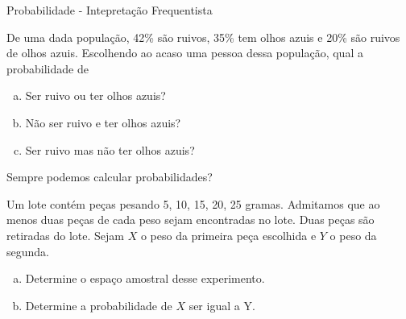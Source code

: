 \begin{frame}{Probabilidade - Intepretação Frequentista}
    \begin{exemplo}
        De uma dada população, 42\% são ruivos, 35\% tem olhos azuis e 20\% são ruivos de olhos azuis. Escolhendo ao acaso uma pessoa dessa população, qual a probabilidade de
        \begin{enumerate}[a)] %
            \item Ser ruivo ou ter olhos azuis?
            \item Não ser ruivo e ter olhos azuis?
            \item Ser ruivo mas não ter olhos azuis?
        \end{enumerate}
    \end{exemplo}

\end{frame}

\begin{frame}{Sempre podemos calcular probabilidades?}
    \begin{exemplo}
        Um lote contém peças pesando 5, 10, 15, 20, 25 gramas. Admitamos que ao menos duas peças de cada peso sejam encontradas no lote. Duas peças são retiradas do lote. Sejam $X$ o peso da primeira peça escolhida e $Y$ o peso da segunda. 
        \begin{enumerate}[a)] %
            \item Determine o espaço amostral desse experimento.
            \item Determine a probabilidade de $X$ ser igual a Y.
        \end{enumerate}
    \end{exemplo}
\end{frame}


